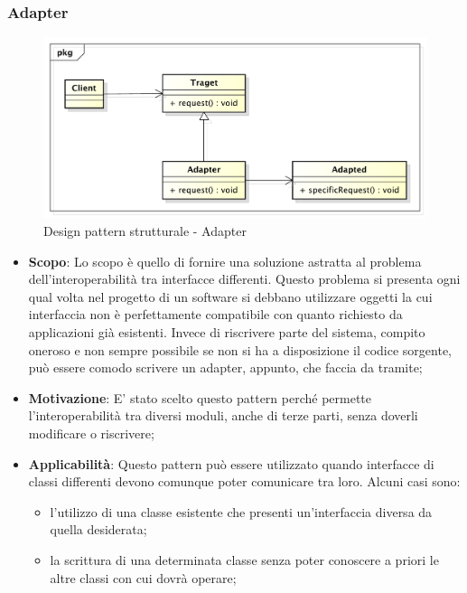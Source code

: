 		\newpage
		\subsubsection{Adapter} %

		\begin{figure}[htbp]
			\centering
			\centerline{\includegraphics[scale=0.5]{./images/designpatternappendice/adapter.pdf}}
			\caption{Design pattern strutturale - Adapter}
		\end{figure}

		\begin{itemize}
			\item \textbf{Scopo}: Lo scopo è quello di fornire una soluzione astratta al problema dell'interoperabilità tra interfacce differenti. Questo problema si presenta ogni qual volta nel progetto di un software si debbano utilizzare oggetti la cui interfaccia non è perfettamente compatibile con quanto richiesto da applicazioni già esistenti. Invece di riscrivere parte del sistema, compito oneroso e non sempre possibile se non si ha a disposizione il codice sorgente, può essere comodo scrivere un adapter, appunto, che faccia da tramite;

			\item \textbf{Motivazione}: E' stato scelto questo pattern perché permette l'interoperabilità tra diversi moduli, anche di terze parti, senza doverli modificare o riscrivere;

			\item \textbf{Applicabilità}: Questo pattern può essere utilizzato quando interfacce di classi differenti devono comunque poter comunicare tra loro. Alcuni casi sono:

			\begin{itemize}
			\item l'utilizzo di una classe esistente che presenti un'interfaccia diversa da quella desiderata;
			\item la scrittura di una determinata classe senza poter conoscere a priori le altre classi con cui dovrà operare;
			\end{itemize}

		\end{itemize}


